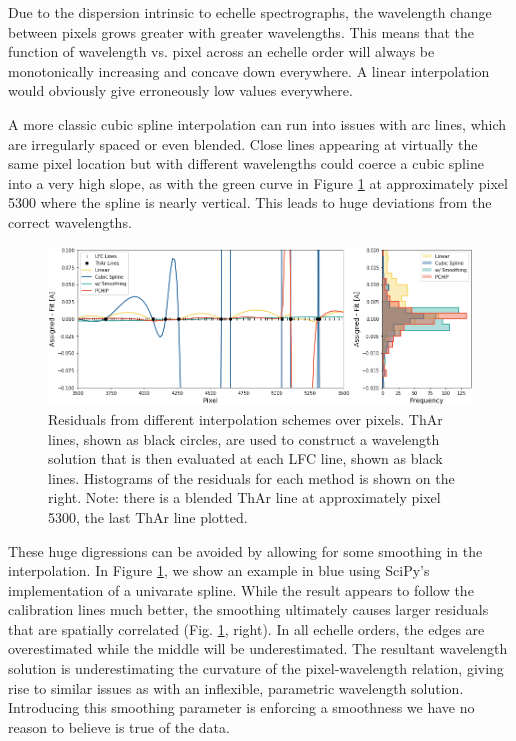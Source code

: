 \documentclass[modern]{aastex63}
\begin{document}
Due to the dispersion intrinsic to echelle spectrographs, the wavelength change between pixels grows greater with greater wavelengths.  This means that the function of wavelength vs. pixel across an echelle order will always be monotonically increasing and concave down everywhere.  A linear interpolation would obviously give erroneously low values everywhere.

A more classic cubic spline interpolation can run into issues with arc lines, which are irregularly spaced or even blended.  Close lines appearing at virtually the same pixel location but with different wavelengths could coerce a cubic spline into a very high slope, as with the green curve in Figure \ref{fig:xinterp} at approximately pixel 5300 where the spline is nearly vertical.  This leads to huge deviations from the correct wavelengths.

\begin{figure}[h]
\centering
\includegraphics[width=\textwidth]{Figures/intpx_tests.png}
\caption{Residuals from different interpolation schemes over pixels.  ThAr lines, shown as black circles, are used to construct a wavelength solution that is then evaluated at each LFC line, shown as black lines.  Histograms of the residuals for each method is shown on the right.  Note: there is a blended ThAr line at approximately pixel 5300, the last ThAr line plotted.}
\label{fig:xinterp}
\end{figure} 

These huge digressions can be avoided by allowing for some smoothing in the interpolation.  In Figure \ref{fig:xinterp}, we show an example in blue using SciPy's implementation of a univarate spline.  While the result appears to follow the calibration lines much better, the smoothing ultimately causes larger residuals that are spatially correlated (Fig. \ref{fig:xinterp}, right).  In all echelle orders, the edges are overestimated while the middle will be underestimated.  The resultant wavelength solution is underestimating the curvature of the pixel-wavelength relation, giving rise to similar issues as with an inflexible, parametric wavelength solution.  Introducing this smoothing parameter is enforcing a smoothness we have no reason to believe is true of the data.
\end{document}
